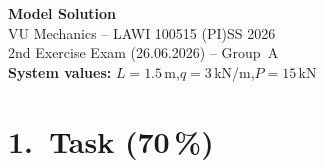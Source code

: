 \documentclass[a4paper,11pt]{article}
\begin{document}

\begin{center}
  {\Large\bfseries Model Solution}\\[4pt]
  {\large VU Mechanics -- LAWI 100515 (PI)\quad SS 2026}\\[2pt]
  {\normalsize 2nd Exercise Exam (26.06.2026) -- Group~A}\\[2pt]
  {\normalsize \textbf{System values:} $L = 1.5$\,m,\quad $q = 3$\,kN/m,\quad $P = 15$\,kN}
\end{center}

\section*{1.~Task \hfill (70\,\%)}
\end{document}
